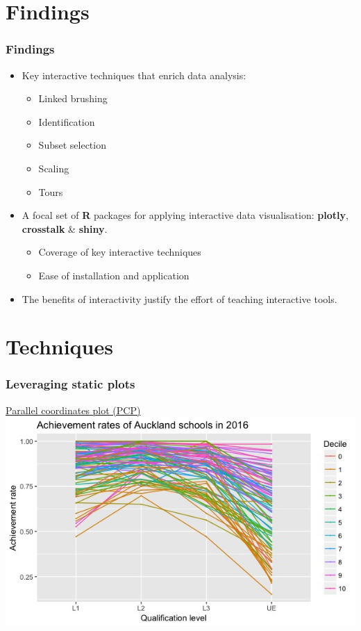 \documentclass{beamer}
\begin{document}
\section{Findings}
\label{sec:findings}

	\begin{frame}
		\frametitle{Findings}
		\begin{itemize}
			\item Key interactive techniques that enrich data analysis:
			\begin{itemize}
				\item Linked brushing
				\item Identification
				\item Subset selection
				\item Scaling 
				\item Tours
			\end{itemize}
			\item A focal set of \textbf{R} packages for applying interactive data visualisation: \textbf{plotly}, \textbf{crosstalk} \& \textbf{shiny}.
			\begin{itemize}
				\item Coverage of key interactive techniques
				\item Ease of installation and application
			\end{itemize}
		\item The benefits of interactivity justify the effort of teaching interactive tools.
		\end{itemize}
	\end{frame}

\section{Techniques}
\label{sec:techniques}

	\begin{frame}
		\frametitle{Leveraging static plots}
		\href{https://shanl33.shinyapps.io/presentation_pcp/}{Parallel coordinates plot (PCP)} 
		\href{https://screencast-o-matic.com/watch/cbXoQc2qfg}{\beamergotobutton{Demo}}
		\includegraphics[scale=0.45]{files/pcp.jpeg}
	\end{frame}
\end{document}
